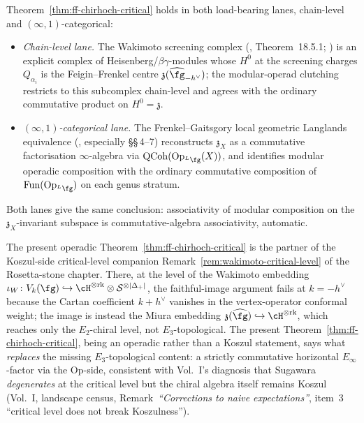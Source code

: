 \begin{remark}
\label{rem:ff-chirhoch-critical-lane-consistency}
%
%
Theorem~\ref{thm:ff-chirhoch-critical} holds in both load-bearing
lanes, chain-level and $(\infty,1)$-categorical:
\begin{itemize}
\item \emph{Chain-level lane.} The Wakimoto screening complex
(\cite{FBZ04}, Theorem~18.5.1; \cite{FF90}) is an explicit complex
of Heisenberg/$\beta\gamma$-modules whose $H^0$ at the screening
charges $Q_{\alpha_i}$ is the Feigin--Frenkel centre
$\mathfrak{z}(\widehat{\fg}_{-h^\vee})$; the modular-operad clutching
restricts to this subcomplex chain-level and agrees with the
ordinary commutative product on $H^0 = \mathfrak{z}$.
\item \emph{$(\infty,1)$-categorical lane.} The
Frenkel--Gaitsgory local geometric Langlands equivalence
(\cite{FG06}, especially \S\S\,4--7) reconstructs
$\mathfrak{z}_X$ as a commutative factorisation
$\infty$-algebra via $\mathrm{QCoh}(\mathrm{Op}_{{}^L\fg}(X))$, and
identifies modular operadic composition with the ordinary
commutative composition of $\mathrm{Fun}(\mathrm{Op}_{{}^L\fg})$ on
each genus stratum.
\end{itemize}
Both lanes give the same conclusion: associativity of modular
composition on the $\mathfrak{z}_X$-invariant subspace is
commutative-algebra associativity, automatic.
\end{remark}

\begin{remark}
\label{rem:vol1-critical-level-companion}
%
The present operadic Theorem~\ref{thm:ff-chirhoch-critical} is
the partner of the Koszul-side critical-level companion
Remark~\ref{rem:wakimoto-critical-level} of the Rosetta-stone
chapter. There, at the level of
the Wakimoto embedding $\iota_W \colon V_k(\fg) \hookrightarrow
\cH^{\otimes\mathrm{rk}}\otimes\cS^{\otimes|\Delta_+|}$, the
faithful-image argument fails at $k=-h^\vee$ because the Cartan
coefficient $k+h^\vee$ vanishes in the vertex-operator conformal
weight; the image is instead the Miura embedding
$\mathfrak{z}(\widehat{\fg})\hookrightarrow \cH^{\otimes\mathrm{rk}}$,
which reaches only the $E_2$-chiral level, not $E_3$-topological.
The present Theorem~\ref{thm:ff-chirhoch-critical}, being an
operadic rather than a Koszul statement, says what \emph{replaces}
the missing $E_3$-topological content: a strictly commutative
horizontal $E_\infty$-factor via the Op-side, consistent with Vol.~I's
diagnosis that Sugawara \emph{degenerates} at the critical level
but the chiral algebra itself remains Koszul (Vol.~I,
landscape census, Remark~\emph{``Corrections to naive expectations''},
item~3 ``critical level does not break Koszulness'').
\end{remark}

